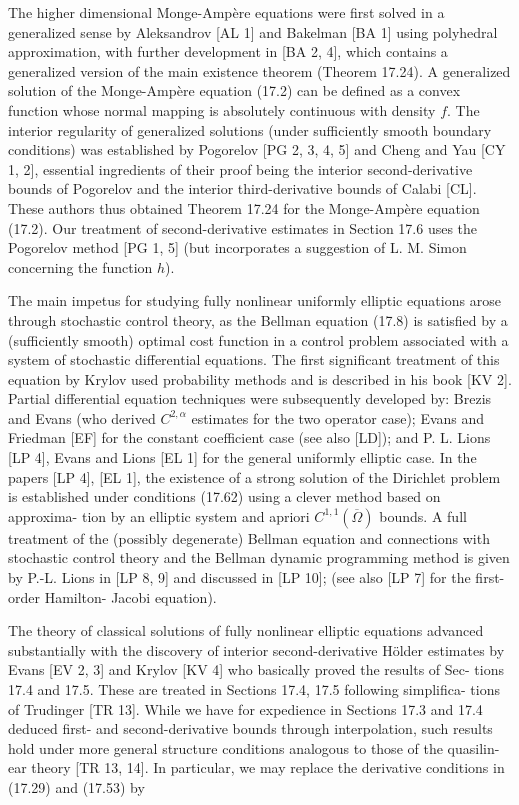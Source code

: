 The higher dimensional Monge-Ampère equations were first solved in a generalized sense by Aleksandrov [AL 1] and Bakelman [BA 1] using polyhedral approximation, with further development in [BA 2, 4], which contains a generalized version of the main existence theorem (Theorem 17.24). A generalized solution of the Monge-Ampère equation (17.2) can be defined as a convex function whose normal mapping is absolutely continuous with density $f$. The interior regularity of generalized solutions (under sufficiently smooth boundary conditions) was established by Pogorelov [PG 2, 3, 4, 5] and Cheng and Yau [CY 1, 2], essential ingredients of their proof being the interior second-derivative bounds of Pogorelov and the interior third-derivative bounds of Calabi [CL]. These authors thus obtained Theorem 17.24 for the Monge-Ampère equation (17.2). Our treatment of second-derivative estimates in Section 17.6 uses the Pogorelov method [PG 1, 5] (but incorporates a suggestion of L. M. Simon concerning the function $h$).



The main impetus for studying fully nonlinear uniformly elliptic equations
arose through stochastic control theory, as the Bellman equation (17.8) is satisfied
by a (sufficiently smooth) optimal cost function in a control problem associated
with a system of stochastic differential equations. The first significant treatment of
this equation by Krylov used probability methods and is described in his book
[KV 2]. Partial differential equation techniques were subsequently developed by:
Brezis and Evans (who derived $C^{2,\alpha}$ estimates for the two operator case); Evans and
Friedman [EF] for the constant coefficient case (see also [LD]); and P. L. Lions
[LP 4], Evans and Lions [EL 1] for the general uniformly elliptic case. In the
papers [LP 4], [EL 1], the existence of a strong solution of the Dirichlet problem is
established under conditions (17.62) using a clever method based on approxima-
tion by an elliptic system and apriori $C^{1,1}(\overline{\Omega})$ bounds. A full treatment of the
(possibly degenerate) Bellman equation and connections with stochastic control
theory and the Bellman dynamic programming method is given by P.-L. Lions in
[LP 8, 9] and discussed in [LP 10]; (see also [LP 7] for the first-order Hamilton-
Jacobi equation).

The theory of classical solutions of fully nonlinear elliptic equations advanced
substantially with the discovery of interior second-derivative H\"older estimates by
Evans [EV 2, 3] and Krylov [KV 4] who basically proved the results of Sec-
tions 17.4 and 17.5. These are treated in Sections 17.4, 17.5 following simplifica-
tions of Trudinger [TR 13]. While we have for expedience in Sections 17.3 and 17.4
deduced first- and second-derivative bounds through interpolation, such results
hold under more general structure conditions analogous to those of the quasilin-
ear theory [TR 13, 14]. In particular, we may replace the derivative conditions in
(17.29) and (17.53) by

